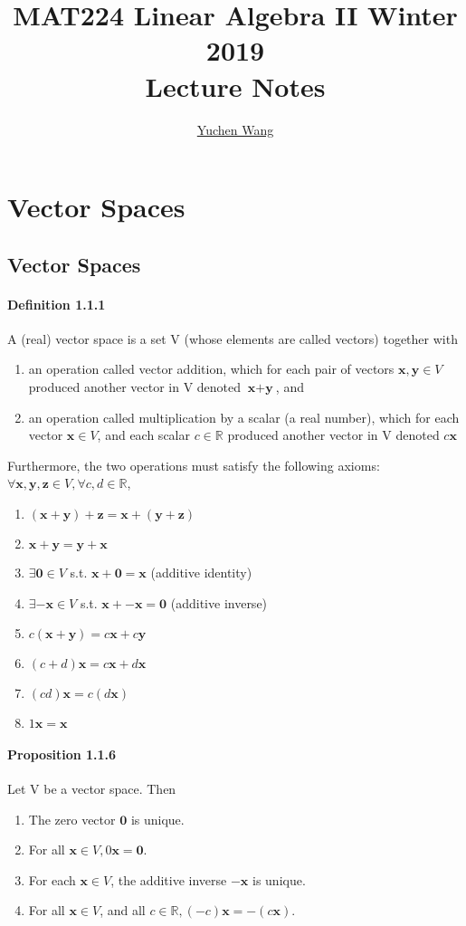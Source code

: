 \documentclass[11pt]{article}
\title{MAT224 Linear Algebra II Winter 2019\\ Lecture Notes}
\author{\textcolor{blue}{\href{https://www.yuchenwyc.com}{Yuchen Wang}}}
\newcommand{\tb}[1]{\textbf{#1}}
\newcommand{\real}[0]{\mathbb{R}}
\newcommand{\vx}[0]{\tb{x}}
\newcommand{\vy}[0]{\tb{y}}
\newcommand{\vz}[0]{\tb{z}}
\newcommand{\vo}[0]{\tb{0}}
\begin{document}
	\maketitle
	\tableofcontents
	\newpage
	\section{Vector Spaces}
	\subsection{Vector Spaces}
	\paragraph{Definition 1.1.1} A (real) vector space is a set V (whose elements are called vectors) together with
	\begin{enumerate}
		\item an operation called vector addition, which for each pair of vectors $\vx, \vy \in V$ produced another vector in V denoted $\vx + \vy$, and
		\item an operation called multiplication by a scalar (a real number), which for each vector $\vx \in V$, and each scalar $c \in \real$ produced another vector in V denoted $c\vx$
	\end{enumerate}
	Furthermore, the two operations must satisfy the following axioms:
	$\forall \vx, \vy, \vz \in V, \forall c, d \in \real$,
	\begin{enumerate}
		\item $(\vx + \vy) + \vz = \vx + (\vy + \vz)$
		\item $\vx + \vy = \vy + \vx$
		\item $\exists \vo \in V$ s.t. $\vx + \vo = \vx$ (additive identity)
		\item $\exists -\vx \in V$ s.t. $\vx + -\vx = \vo$ (additive inverse)
		\item $c(\vx + \vy) = c\vx + c\vy$
		\item $(c + d)\vx = c\vx + d\vx$
		\item $(cd)\vx = c(d\vx)$
		\item $1\vx = \vx$
	\end{enumerate}
	\paragraph{Proposition 1.1.6}
	Let V be a vector space. Then
	\begin{enumerate}
		\item The zero vector $\vo$ is unique.
		\item For all $\vx \in V, 0\vx = \vo$.
		\item For each $\vx \in V$, the additive inverse $-\vx$ is unique.
		\item For all $\vx \in V$, and all $c \in \real, (-c)\vx = -(c\vx)$.
	\end{enumerate}
\end{document}
